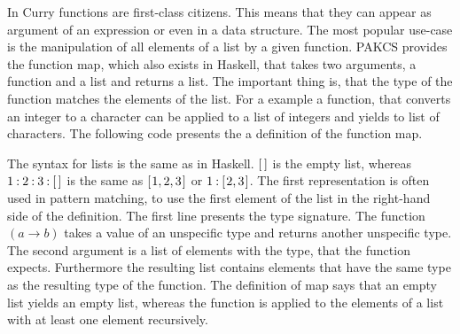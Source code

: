 \documentclass[%
	pdftex,%
	a4paper,%
	oneside,%
	chapterprefix,%
	headsepline,%
	12pt%
]{scrbook}
\newcommand{\Varid}[1]{\mathit{#1}}
\def\resethooks{%
  \global\let\SaveRestoreHook\empty
  \global\let\ColumnHook\empty}
\let\hspre\empty
\let\hspost\empty
\begin{document}
In Curry functions are first-class citizens. This means that they can
appear as argument of an expression or even in a data structure. The
most popular use-case is the manipulation of all elements of a list by
a given function. PAKCS provides the function map, which also exists
in Haskell, that takes two arguments, a function and a list and
returns a list. The important thing is, that the type of the function
matches the elements of the list. For a example a function, that
converts an integer to a character can be applied to a list of
integers and yields to list of characters. The following code presents
the a definition of the function map.
\resethooks
The syntax for lists is the same as in Haskell. \ensuremath{[\mskip1.5mu \mskip1.5mu]} is the empty
list, whereas \ensuremath{\mathrm{1}\mathbin{:}\mathrm{2}\mathbin{:}\mathrm{3}\mathbin{:}[\mskip1.5mu \mskip1.5mu]} is the same as \ensuremath{[\mskip1.5mu \mathrm{1},\mathrm{2},\mathrm{3}\mskip1.5mu]} or \ensuremath{\mathrm{1}\mathbin{:}[\mskip1.5mu \mathrm{2},\mathrm{3}\mskip1.5mu]}. The
first representation is often used in pattern matching, to use the
first element of the list in the right-hand side of the
definition. 
The first line presents the type signature. The function
\ensuremath{(\Varid{a}\to \Varid{b})} takes a value of an unspecific type and returns another
unspecific type. The second argument is a list of elements with the
type, that the function expects. Furthermore the resulting list
contains elements that have the same type as the resulting type of the
function. 
The definition of map says that an empty list yields an
empty list, whereas the function is applied to
the elements of a list with at least one element recursively.\\
\end{document}
